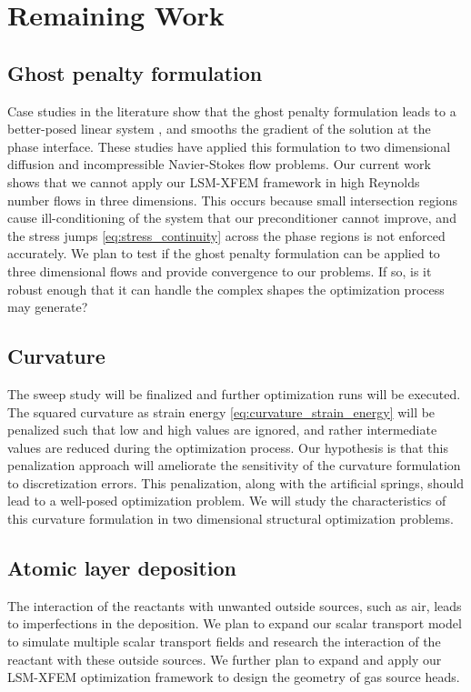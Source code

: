 \documentclass[12pt,letterpaper]{report}
\begin{document}

\chapter{Remaining Work}
\label{sec:remaining_work}

\section{Ghost penalty formulation}
Case studies in the literature show that the ghost penalty formulation leads to a better-posed linear system \citep{SW:14, SRG+:14, BH:12}, and smooths the gradient of the solution at the phase interface. These studies have applied this formulation to two dimensional diffusion and incompressible Navier-Stokes flow problems. Our current work shows that we cannot apply our LSM-XFEM framework in high Reynolds number flows in three dimensions. This occurs because small intersection regions cause ill-conditioning of the system that our preconditioner cannot improve, and the stress jumps \ref{eq:stress_continuity} across the phase regions is not enforced accurately. We plan to test if the ghost penalty formulation can be applied to three dimensional flows and provide convergence to our problems. If so, is it robust enough that it can handle the complex shapes the optimization process may generate?

\section{Curvature}
The sweep study will be finalized and further optimization runs will be executed. The squared curvature as strain energy \ref{eq:curvature_strain_energy} will be penalized such that low and high values are ignored, and rather intermediate values are reduced during the optimization process. Our hypothesis is that this penalization approach will ameliorate the sensitivity of the curvature formulation to discretization errors. This penalization, along with the artificial springs, should lead to a well-posed optimization problem. We will study the characteristics of this curvature formulation in two dimensional structural optimization problems.

\section{Atomic layer deposition}
The interaction of the reactants with unwanted outside sources, such as air, leads to imperfections in the deposition. We plan to expand our scalar transport model to simulate multiple scalar transport fields and research the interaction of the reactant with these outside sources. We further plan to expand and apply our LSM-XFEM optimization framework to design the geometry of gas source heads.
\end{document}
